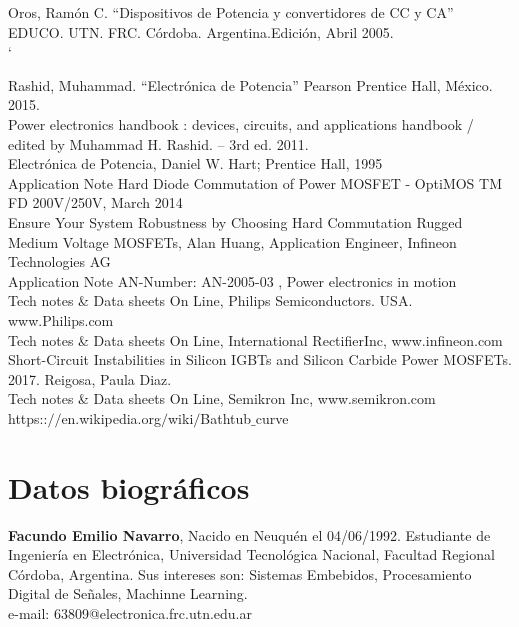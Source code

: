 \documentclass[conference]{IEEEtran}
\begin{document}
\begin{thebibliography}{9}
Oros, Ramón C. “Dispositivos de Potencia y convertidores de CC y CA” EDUCO. UTN. FRC. Córdoba. Argentina.Edición, Abril 2005. \\ 
`

Rashid, Muhammad. “Electrónica de Potencia” Pearson Prentice Hall, México. 2015. \\


Power electronics handbook : devices, circuits, and applications handbook / edited by Muhammad H. Rashid. – 3rd ed. 2011. \\


Electrónica de Potencia, Daniel W. Hart; Prentice Hall, 	1995 \\

Application Note Hard Diode Commutation of Power MOSFET - OptiMOS TM FD 200V/250V, March 2014\\

Ensure Your System Robustness by Choosing Hard Commutation Rugged Medium Voltage MOSFETs, Alan Huang, Application Engineer, Infineon Technologies AG \\

Application Note AN-Number: AN-2005-03 , Power electronics in motion \\

Tech notes \& Data sheets On Line, Philips Semiconductors.  USA. www.Philips.com \\


Tech notes \& Data sheets On Line, International RectifierInc, www.infineon.com \\

Short-Circuit Instabilities in Silicon IGBTs and Silicon Carbide Power MOSFETs. 2017.  Reigosa, Paula Diaz.\\

Tech notes \& Data sheets On Line, Semikron Inc,
www.semikron.com \\

https::$//$en.wikipedia.org$/$wiki$/$Bathtub$\_$curve



\end{thebibliography}

\section{Datos biográficos}

\textbf{Facundo Emilio Navarro}, Nacido en Neuquén el 04/06/1992. Estudiante de Ingeniería en Electrónica, Universidad Tecnológica Nacional, Facultad Regional Córdoba, Argentina. Sus intereses son: Sistemas Embebidos, Procesamiento Digital de Señales, Machinne Learning.\\

e-mail: 63809@electronica.frc.utn.edu.ar 
\end{document}
